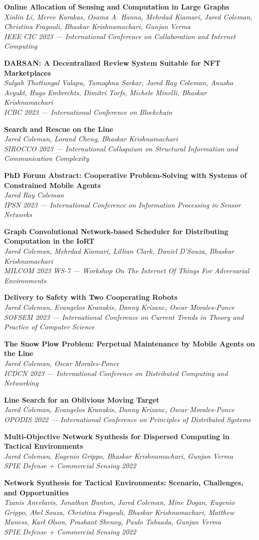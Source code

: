 \documentclass[letterpaper,11pt]{article}
\newcommand{\pub}[3]{
  \vspace{-1pt}\item \textbf{#1} \\ 
    \textit{\small#2} \\
    \textit{\small#3}\vspace{-5pt}
}
\begin{document}
    \pub
    {Online Allocation of Sensing and Computation in Large Graphs}
    {Xinlin Li, Merve Karakas, Osama A. Hanna, Mehrdad Kiamari, Jared Coleman, Christina Fragouli, Bhaskar Krishnamachari, Gunjan Verma}
    {IEEE CIC 2023 --- International Conference on Collaboration and Internet Computing}
    
    \pub
    {DARSAN: A Decentralized Review System Suitable for NFT Marketplaces}
    {Sulyab Thottungal Valapu, Tamoghna Sarkar, Jared Ray Coleman, Anusha Avyukt, Hugo Embrechts, Dimitri Torfs, Michele Minelli, Bhaskar Krishnamachari}
    {ICBC 2023 --- International Conference on Blockchain}

    \pub
    {Search and Rescue on the Line}
    {Jared Coleman, Lorand Cheng, Bhaskar Krishnamachari}
    {SIROCCO 2023 --- International Colloquium on Structural Information and Communication Complexity}

    \pub
    {PhD Forum Abstract: Cooperative Problem-Solving with Systems of Constrained Mobile Agents}
    {Jared Ray Coleman}
    {IPSN 2023 --- International Conference on Information Processing in Sensor Networks}

    \pub
    {Graph Convolutional Network-based Scheduler for Distributing Computation in the IoRT}
    {Jared Coleman, Mehrdad Kiamari, Lillian Clark, Daniel D'Souza, Bhaskar Krishnamachari}
    {MILCOM 2023 WS-7 --- Workshop On The Internet Of Things For Adversarial Environments}

    \pub
    {Delivery to Safety with Two Cooperating Robots}
    {Jared Coleman, Evangelos Kranakis, Danny Krizanc, Oscar Morales-Ponce}
    {SOFSEM 2023 --- International Conference on Current Trends in Theory and Practice of Computer Science}

    \pub
    {The Snow Plow Problem: Perpetual Maintenance by Mobile Agents on the Line}
    {Jared Coleman, Oscar Morales-Ponce}
    {ICDCN 2023 --- International Conference on Distributed Computing and Networking}

    \pub
    {Line Search for an Oblivious Moving Target}
    {Jared Coleman, Evangelos Kranakis, Danny Krizanc, Oscar Morales-Ponce}
    {OPODIS 2022 --- International Conference on Principles of Distributed Systems}

    \pub
    {Multi-Objective Network Synthesis for Dispersed Computing in Tactical Environments}
    {Jared Coleman, Eugenio Grippo, Bhaskar Krishnamachari, Gunjan Verma}
    {SPIE Defense + Commercial Sensing 2022}

    \pub
    {Network Synthesis for Tactical Environments: Scenario, Challenges, and Opportunities}
    {Tzanis Anevlavis, Jonathan Bunton, Jared Coleman, Mine Dogan, Eugenio Grippo, Abel Souza, Christina Fragouli, Bhaskar Krishnamachari, Matthew Maness, Karl Olson, Prashant Shenoy, Paulo Tabuada, Gunjan Verma}
    {SPIE Defense + Commercial Sensing 2022}
\end{document}
